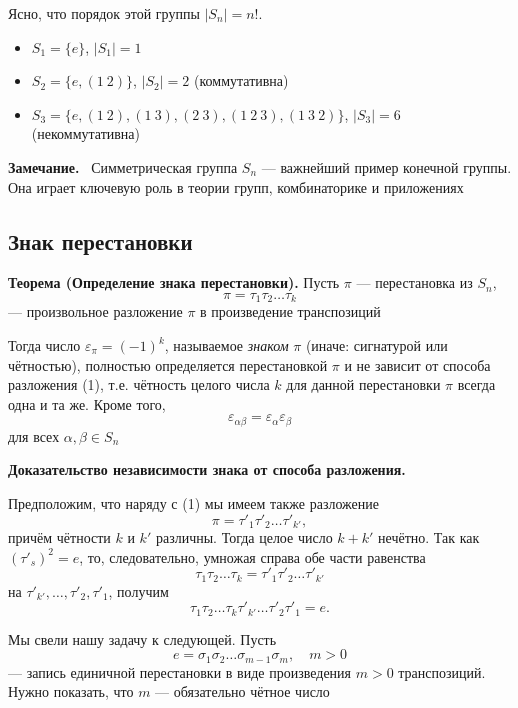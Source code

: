 \documentclass[a4paper,12pt]{article}
\newcommand{\myremark}{\textbf{Замечание.}\ }
\theoremstyle{definition}
\theoremstyle{plain}
\theoremstyle{remark}
\begin{document}
	Ясно, что порядок этой группы $|S_n| = n!$.
	
	\begin{tcolorbox}[colback=gray!5, colframe=gray!50, title=Примеры]
		\begin{itemize}
			\item $S_1 = \{e\}$, $|S_1| = 1$
			\item $S_2 = \{e, (1\ 2)\}$, $|S_2| = 2$ (коммутативна)
			\item $S_3 = \{e, (1\ 2), (1\ 3), (2\ 3), (1\ 2\ 3), (1\ 3\ 2)\}$, $|S_3| = 6$ (некоммутативна)
		\end{itemize}
	\end{tcolorbox}
	
	\myremark
	Симметрическая группа $S_n$ — важнейший пример конечной группы. Она играет ключевую роль в теории групп, комбинаторике и приложениях
	
	\subsection{Знак перестановки}
	
	\noindent \textbf{Теорема (Определение знака перестановки).}
	Пусть $\pi$ — перестановка из $S_n$,
	\[
	\pi = \tau_1 \tau_2 \dots \tau_k \tag{1}
	\]
	— произвольное разложение $\pi$ в произведение транспозиций
	
	Тогда число $\varepsilon_\pi = (-1)^k$, называемое \textit{знаком} $\pi$ (иначе: сигнатурой или чётностью), полностью определяется перестановкой $\pi$ и не зависит от способа разложения (1), т.е. чётность целого числа $k$ для данной перестановки $\pi$ всегда одна и та же. Кроме того,
	\[
	\varepsilon_{\alpha \beta} = \varepsilon_\alpha \varepsilon_\beta
	\]
	для всех $\alpha, \beta \in S_n$
	
	\medskip
	\noindent \textbf{Доказательство независимости знака от способа разложения.}
	
	Предположим, что наряду с (1) мы имеем также разложение
	\[
	\pi = \tau'_1 \tau'_2 \dots \tau'_{k'},
	\]
	причём чётности $k$ и $k'$ различны. Тогда целое число $k + k'$ нечётно. Так как $(\tau'_s)^2 = e$, то, следовательно, умножая справа обе части равенства
	\[
	\tau_1 \tau_2 \dots \tau_k = \tau'_1 \tau'_2 \dots \tau'_{k'}
	\]
	на $\tau'_{k'}, \dots, \tau'_2, \tau'_1$, получим
	\[
	\tau_1 \tau_2 \dots \tau_k \tau'_{k'} \dots \tau'_2 \tau'_1 = e.
	\]
	
	Мы свели нашу задачу к следующей. Пусть
	\[
	e = \sigma_1 \sigma_2 \dots \sigma_{m-1} \sigma_m, \quad m > 0 \tag{2}
	\]
	— запись единичной перестановки в виде произведения $m > 0$ транспозиций. Нужно показать, что $m$ — обязательно чётное число
	
\end{document}
